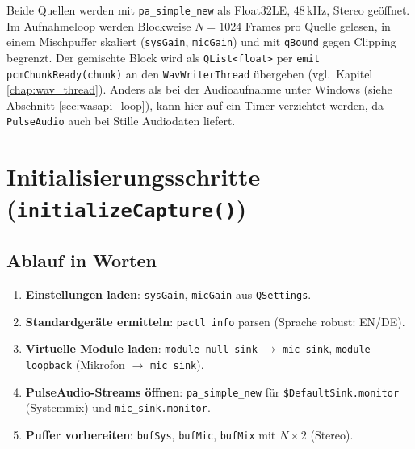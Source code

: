Beide Quellen werden mit \texttt{pa\_simple\_new} als Float32LE, $48$\,kHz, Stereo geöffnet. Im Aufnahmeloop werden Blockweise $N=1024$ Frames pro Quelle gelesen, in einem Mischpuffer skaliert (\texttt{sysGain}, \texttt{micGain}) und mit \texttt{qBound} gegen Clipping begrenzt. Der gemischte Block wird als \texttt{QList<float>} per \texttt{emit pcmChunkReady(chunk)} an den \texttt{WavWriterThread} übergeben (vgl.\ Kapitel \ref{chap:wav_thread}). Anders als bei der Audioaufnahme unter Windows (siehe Abschnitt \ref{sec:wasapi_loop}), kann hier auf ein Timer verzichtet werden, da \texttt{PulseAudio} auch bei Stille Audiodaten liefert.

\section{Initialisierungsschritte (\texttt{initializeCapture()})}
\label{sec:linux_initialize}

\subsection*{Ablauf in Worten}
\begin{enumerate}
    \item \textbf{Einstellungen laden}: \texttt{sysGain}, \texttt{micGain} aus \texttt{QSettings}.
    \item \textbf{Standardgeräte ermitteln}: \texttt{pactl info} parsen (Sprache robust: EN/DE).
    \item \textbf{Virtuelle Module laden}: \texttt{module-null-sink} $\rightarrow$ \texttt{mic\_sink},
    \texttt{module-loopback} (Mikrofon $\rightarrow$ \texttt{mic\_sink}).
    \item \textbf{PulseAudio-Streams öffnen}:
    \texttt{pa\_simple\_new} für \texttt{\$DefaultSink.monitor} (Systemmix) und \texttt{mic\_sink.monitor}.
    \item \textbf{Puffer vorbereiten}: \texttt{bufSys}, \texttt{bufMic}, \texttt{bufMix} mit $N\times 2$ (Stereo).
\end{enumerate}



